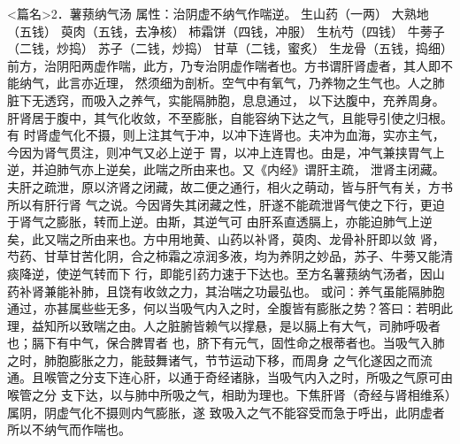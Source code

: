 \documentclass[a4paper,12pt,UTF8,twoside]{ctexbook}
\begin{document}
<篇名>2．薯蓣纳气汤
属性：治阴虚不纳气作喘逆。 
生山药（一两） 大熟地（五钱） 萸肉（五钱，去净核） 柿霜饼（四钱，冲服） 生杭芍（四钱） 
牛蒡子（二钱，炒捣） 苏子（二钱，炒捣） 甘草（二钱，蜜炙） 生龙骨（五钱，捣细） 
前方，治阴阳两虚作喘，此方，乃专治阴虚作喘者也。方书谓肝肾虚者，其人即不能纳气，此言亦近理， 
然须细为剖析。空气中有氧气，乃养物之生气也。人之肺脏下无透窍，而吸入之养气，实能隔肺胞，息息通过， 
以下达腹中，充养周身。肝肾居于腹中，其气化收敛，不至膨胀，自能容纳下达之气，且能导引使之归根。有 
时肾虚气化不摄，则上注其气于冲，以冲下连肾也。夫冲为血海，实亦主气，今因为肾气贯注，则冲气又必上逆于 
胃，以冲上连胃也。由是，冲气兼挟胃气上逆，并迫肺气亦上逆矣，此喘之所由来也。又《内经》谓肝主疏， 
泄肾主闭藏。夫肝之疏泄，原以济肾之闭藏，故二便之通行，相火之萌动，皆与肝气有关，方书所以有肝行肾 
气之说。今因肾失其闭藏之性，肝遂不能疏泄肾气使之下行，更迫于肾气之膨胀，转而上逆。由斯，其逆气可 
由肝系直透膈上，亦能迫肺气上逆矣，此又喘之所由来也。方中用地黄、山药以补肾，萸肉、龙骨补肝即以敛 
肾，芍药、甘草甘苦化阴，合之柿霜之凉润多液，均为养阴之妙品，苏子、牛蒡又能清痰降逆，使逆气转而下 
行，即能引药力速于下达也。至方名薯蓣纳气汤者，因山药补肾兼能补肺，且饶有收敛之力，其治喘之功最弘也。 
或问∶养气虽能隔肺胞通过，亦甚属些些无多，何以当吸气内入之时，全腹皆有膨胀之势？答曰∶若明此 
理，益知所以致喘之由。人之脏腑皆赖气以撑悬，是以膈上有大气，司肺呼吸者也；膈下有中气，保合脾胃者 
也，脐下有元气，固性命之根蒂者也。当吸气入肺之时，肺胞膨胀之力，能鼓舞诸气，节节运动下移，而周身 
之气化遂因之而流通。且喉管之分支下连心肝，以通于奇经诸脉，当吸气内入之时，所吸之气原可由喉管之分 
支下达，以与肺中所吸之气，相助为理也。下焦肝肾（奇经与肾相维系）属阴，阴虚气化不摄则内气膨胀，遂 
致吸入之气不能容受而急于呼出，此阴虚者所以不纳气而作喘也。 
\end{document}
